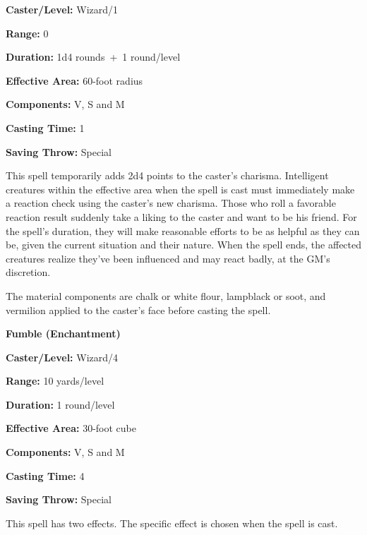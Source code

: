 \begin{multicols}{2}
\begin{minipage}{\columnwidth}
\noindent \textbf{Caster/Level:} Wizard/1

\noindent \textbf{Range:} 0

\noindent \textbf{Duration:} 1d4 rounds~+~1 round/level

\noindent \textbf{Effective Area:} 60-foot radius

\noindent \textbf{Components:} V, S and M

\noindent \textbf{Casting Time:} 1

\noindent \textbf{Saving Throw:} Special

\end{minipage}

This spell temporarily adds 2d4 points to the caster's charisma.  Intelligent creatures within the effective area when the spell is cast must immediately make a reaction check using the caster's new charisma.  Those who roll a favorable reaction result suddenly take a liking to the caster and want to be his friend.  For the spell's duration, they will make reasonable efforts to be as helpful as they can be, given the current situation and their nature.  When the spell ends, the affected creatures realize they've been influenced and may react badly, at the GM's discretion.

The material components are chalk or white flour, lampblack or soot, and vermilion applied to the caster's face before casting the spell.

\vspace{1em}

\noindent
\begin{minipage}{\columnwidth}

\noindent \textbf{Fumble (Enchantment)}

\noindent \textbf{Caster/Level:} Wizard/4

\noindent \textbf{Range:} 10 yards/level

\noindent \textbf{Duration:} 1 round/level

\noindent \textbf{Effective Area:} 30-foot cube

\noindent \textbf{Components:} V, S and M

\noindent \textbf{Casting Time:} 4

\noindent \textbf{Saving Throw:} Special

\end{minipage}

This spell has two effects.  The specific effect is chosen when the spell is cast.


\end{multicols}
